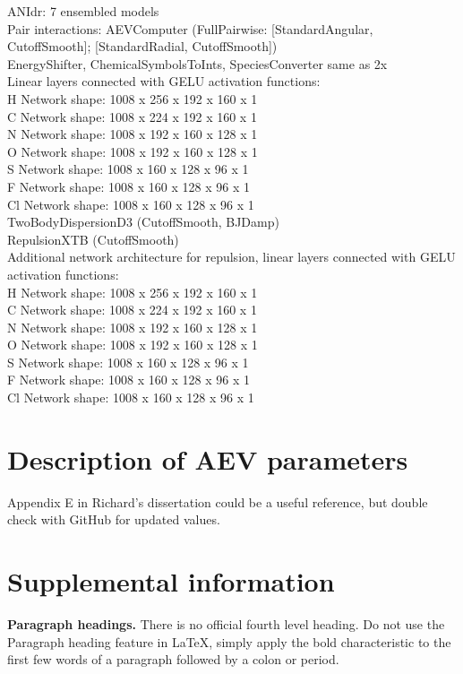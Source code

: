 ANIdr: 7 ensembled models \\
Pair interactions: AEVComputer (FullPairwise: [StandardAngular, CutoffSmooth]; [StandardRadial, CutoffSmooth]) \\
EnergyShifter, ChemicalSymbolsToInts, SpeciesConverter same as 2x \\
Linear layers connected with GELU activation functions: \\
H Network shape: 1008 x 256 x 192 x 160 x 1 \\
C Network shape: 1008 x 224 x 192 x 160 x 1 \\
N Network shape: 1008 x 192 x 160 x 128 x 1 \\
O Network shape: 1008 x 192 x 160 x 128 x 1 \\
S Network shape: 1008 x 160 x 128 x 96 x 1 \\
F Network shape: 1008 x 160 x 128 x 96 x 1 \\
Cl Network shape: 1008 x 160 x 128 x 96 x 1 \\
TwoBodyDispersionD3 (CutoffSmooth, BJDamp) \\
RepulsionXTB (CutoffSmooth) \\
Additional network architecture for repulsion, linear layers connected with GELU activation functions: \\
H Network shape: 1008 x 256 x 192 x 160 x 1 \\
C Network shape: 1008 x 224 x 192 x 160 x 1 \\
N Network shape: 1008 x 192 x 160 x 128 x 1 \\
O Network shape: 1008 x 192 x 160 x 128 x 1 \\
S Network shape: 1008 x 160 x 128 x 96 x 1 \\
F Network shape: 1008 x 160 x 128 x 96 x 1 \\
Cl Network shape: 1008 x 160 x 128 x 96 x 1 \\


\chapter{Description of AEV parameters}

Appendix E in Richard's dissertation could be a useful reference, but double check with GitHub for updated values.

\chapter{Supplemental information}
{\bf Paragraph headings.} There is no official fourth level heading. Do not use the Paragraph heading feature in LaTeX, simply apply the bold characteristic to the first few words of a paragraph followed by a colon or period.

